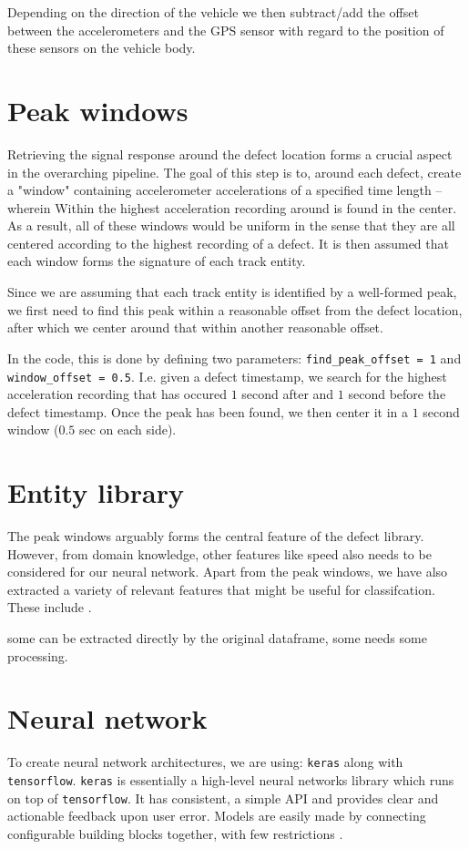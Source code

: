 Depending on the direction of the vehicle we then subtract/add the offset between the accelerometers and the GPS sensor with regard to the position of these sensors on the vehicle body.


\section{Peak windows}
Retrieving the signal response around the defect location forms a crucial aspect in the overarching pipeline. The goal of this step is to, around each defect, create a "window" containing accelerometer accelerations of a specified time length -- wherein Within the highest acceleration recording around is found in the center. As a result, all of these windows would be uniform in the sense that they are all centered according to the highest recording of a defect. It is then assumed that each window forms the signature of each track entity. 

Since we are assuming that each track entity is identified by a well-formed peak, we first need to find this peak within a reasonable offset from the defect location, after which we center around that within another reasonable offset. 

In the code, this is done by defining two parameters: \verb|find_peak_offset = 1| and \verb|window_offset = 0.5|. I.e. given a defect timestamp, we search for the highest acceleration recording that has occured $1$ second after and $1$ second before the defect timestamp. Once the peak has been found, we then center it in a $1$ second window ($0.5$ sec on each side).


\section{Entity library}
The peak windows arguably forms the central feature of the defect library. However, from domain knowledge, other features like speed also needs to be considered for our neural network. Apart from the peak windows, we have also extracted a variety of relevant features that might be useful for classifcation. These include .

some can be extracted directly by the original dataframe, some needs some processing.

\section{Neural network}
To create neural network architectures, we are using: \verb|keras| along with \verb|tensorflow|. \verb|keras| is essentially a high-level neural networks library which runs on top of \verb|tensorflow|. It has consistent, a simple API and provides clear and actionable feedback upon user error. Models are easily made by connecting configurable building blocks together, with few restrictions \cite{TensorFl31:online}.

